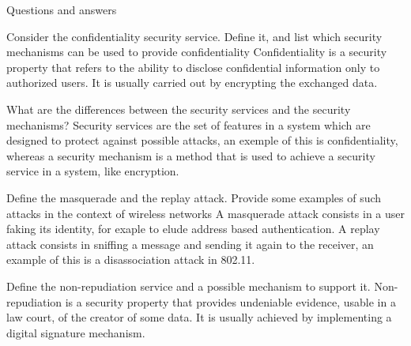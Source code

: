 \begin{section}{Questions and answers}
  \begin{subsubsection}{Consider the confidentiality security service. Define it, and list which
    security mechanisms can be used to provide confidentiality}
    Confidentiality is a security property that refers to the ability to disclose confidential
    information only to authorized users. It is usually carried out by encrypting the exchanged
    data.
  \end{subsubsection}

  \begin{subsubsection}{What are the differences between the security services and the security
    mechanisms?}
    Security services are the set of features in a system which are designed to protect against
    possible attacks, an exemple of this is confidentiality, whereas a security mechanism is a
    method that is used to achieve a security service in a system, like encryption.
  \end{subsubsection}

  \begin{subsubsection}{Define the masquerade and the replay attack. Provide some examples of such
    attacks in the context of wireless networks}
    A masquerade attack consists in a user faking its identity, for exaple to elude address based
    authentication.
    A replay attack consists in sniffing a message and sending it again to the receiver, an example
    of this is a disassociation attack in 802.11.
  \end{subsubsection}

  \begin{subsubsection}{Define the non-repudiation service and a possible mechanism to support it.}
    Non-repudiation is a security property that provides undeniable evidence, usable in a law court,
    of the creator of some data.
    It is usually achieved by implementing a digital signature mechanism.
  \end{subsubsection}


\end{section}
